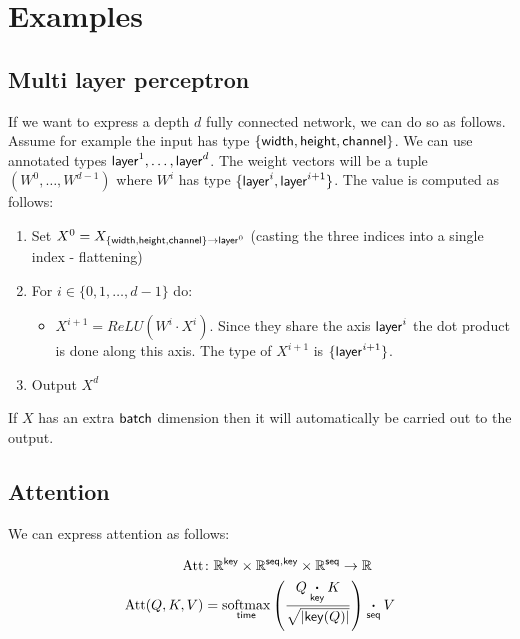 \documentclass{article}
\begin{document}
\section{Examples}
\label{sec:examples}

\subsection{Multi layer perceptron}

If we want to express a depth $d$ fully connected network, we can do so as follows.
Assume for example the input has type $\{ \name{width}, \name{height} , \name{channel} \}$.
We can use annotated types $\name{layer}^1,\ldots,\name{layer}^d$. 
The weight vectors will be a tuple $(W^0,\ldots,W^{d-1})$ where $W^i$ has type $\{ \name{layer}^{i},\name{layer}^{i+1} \}$.
The value is computed as follows:

\begin{enumerate}

\item Set $X^0 = X_{\{ \name{width}, \name{height} , \name{channel} \} \rightarrow \name{layer}^0 }$ (casting the three indices into a single index - flattening)

\item For $i \in \{0,1,\ldots, d-1\}$ do:


\begin{itemize}
    \item $X^{i+1} = ReLU(W^i \cdot X^i)$. Since they share the axis $\name{layer}^i$ the dot product is done along this axis. The type of $X^{i+1}$ is $\{ \name{layer}^{i+1} \}$.
\end{itemize}

\item Output $X^d$
\end{enumerate}

If $X$ has an extra $\name{batch}$ dimension then it will automatically be carried out to the output.



\subsection{Attention}

We can express attention as follows:


\begin{align*}
  \text{Att} &\colon \mathbb{R}^{\name{key}} \times \mathbb{R}^{\name{seq},\name{key}} \times \mathbb{R}^{\name{seq}} \rightarrow \mathbb{R} \\
  \text{Att}(Q,K,V) &= \nfun{time}{softmax} \left( \frac{Q \ndot{key} K}{\sqrt{|\name{key}(Q)|}} \right) \nadot{\name{seq}} V
\end{align*}
\end{document}
